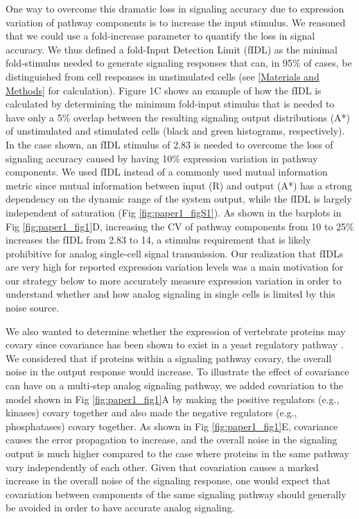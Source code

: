 One way to overcome this dramatic loss in signaling accuracy due to expression variation of pathway components is to increase the input stimulus. We reasoned that we could use a fold‐increase parameter to quantify the loss in signal accuracy. We thus defined a fold‐Input Detection Limit (fIDL) as the minimal fold‐stimulus needed to generate signaling responses that can, in 95\% of cases, be distinguished from cell responses in unstimulated cells (see \ref{Materials and Methods} for calculation). Figure 1C shows an example of how the fIDL is calculated by determining the minimum fold‐input stimulus that is needed to have only a 5\% overlap between the resulting signaling output distributions (A*) of unstimulated and stimulated cells (black and green histograms, respectively). In the case shown, an fIDL stimulus of 2.83 is needed to overcome the loss of signaling accuracy caused by having 10\% expression variation in pathway components. We used fIDL instead of a commonly used mutual information metric since mutual information between input (R) and output (A*) has a strong dependency on the dynamic range of the system output, while the fIDL is largely independent of saturation (Fig \ref{fig:paper1_figS1}). As shown in the barplots in Fig \ref{fig:paper1_fig1}D, increasing the CV of pathway components from 10 to 25\% increases the fIDL from 2.83 to 14, a stimulus requirement that is likely prohibitive for analog single‐cell signal transmission. Our realization that fIDLs are very high for reported expression variation levels was a main motivation for our strategy below to more accurately measure expression variation in order to understand whether and how analog signaling in single cells is limited by this noise source.

We also wanted to determine whether the expression of vertebrate proteins may covary since covariance has been shown to exist in a yeast regulatory pathway \cite{Stewart-Ornstein2012}. We considered that if proteins within a signaling pathway covary, the overall noise in the output response would increase. To illustrate the effect of covariance can have on a multi‐step analog signaling pathway, we added covariation to the model shown in Fig \ref{fig:paper1_fig1}A by making the positive regulators (e.g., kinases) covary together and also made the negative regulators (e.g., phosphatases) covary together. As shown in Fig \ref{fig:paper1_fig1}E, covariance causes the error propagation to increase, and the overall noise in the signaling output is much higher compared to the case where proteins in the same pathway vary independently of each other. Given that covariation causes a marked increase in the overall noise of the signaling response, one would expect that covariation between components of the same signaling pathway should generally be avoided in order to have accurate analog signaling.

